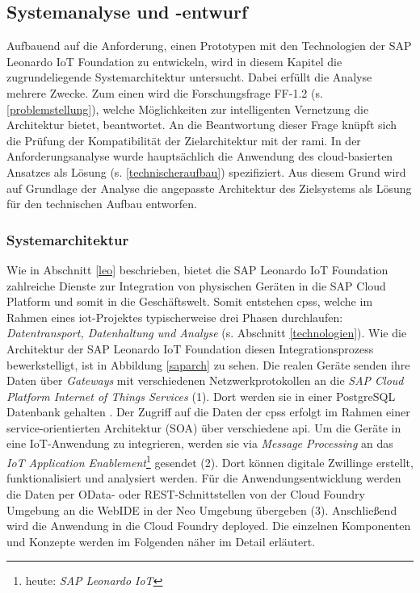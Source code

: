 \subsection{Systemanalyse und -entwurf}

Aufbauend auf die Anforderung, einen Prototypen mit den Technologien der SAP Leonardo IoT Foundation zu entwickeln, wird in diesem Kapitel die zugrundeliegende Systemarchitektur untersucht. Dabei erfüllt die Analyse mehrere Zwecke. Zum einen wird die Forschungsfrage FF-1.2 (s. \ref{problemstellung}), welche Möglichkeiten zur intelligenten Vernetzung die Architektur bietet, beantwortet. An die Beantwortung dieser Frage knüpft sich die Prüfung der Kompatibilität der Zielarchitektur mit der \ac{rami}. In der Anforderungsanalyse wurde hauptsächlich die Anwendung des cloud-basierten Ansatzes als Lösung (s. \ref{technischeraufbau}) spezifiziert. Aus diesem Grund wird auf Grundlage der Analyse die angepasste Architektur des Zielsystems als Lösung für den technischen Aufbau entworfen.

\subsubsection{Systemarchitektur}

Wie in Abschnitt \ref{leo} beschrieben, bietet die SAP Leonardo IoT Foundation zahlreiche Dienste zur Integration von physischen Geräten in die SAP Cloud Platform und somit in die Geschäftswelt. Somit entstehen \ac{cpss}, welche im Rahmen eines \ac{iot}-Projektes typischerweise drei Phasen durchlaufen: \textit{Datentransport, Datenhaltung und Analyse} (s. Abschnitt \ref{technologien}). Wie die Architektur der SAP Leonardo IoT Foundation diesen Integrationsprozess bewerkstelligt, ist in Abbildung \ref{saparch} zu sehen. Die realen Geräte senden ihre Daten über \textit{Gateways} mit verschiedenen Netzwerkprotokollen an die \textit{SAP Cloud Platform Internet of Things Services} (1). Dort werden sie in einer PostgreSQL Datenbank gehalten \citep{Acharya2019}. Der Zugriff auf die Daten der \ac{cpss} erfolgt im Rahmen einer service-orientierten Architektur (SOA) über verschiedene \ac{api}. Um die Geräte in eine IoT-Anwendung zu integrieren, werden sie via \textit{Message Processing} an das \textit{IoT Application Enablement}\footnote{heute: \textit{SAP Leonardo IoT}} gesendet (2). Dort können digitale Zwillinge erstellt, funktionalisiert und analysiert werden. Für die Anwendungsentwicklung werden die Daten per OData- oder REST-Schnittstellen von der Cloud Foundry Umgebung an die WebIDE in der Neo Umgebung übergeben (3). Anschließend wird die Anwendung in die Cloud Foundry deployed. Die einzelnen Komponenten und Konzepte werden im Folgenden näher im Detail erläutert.


